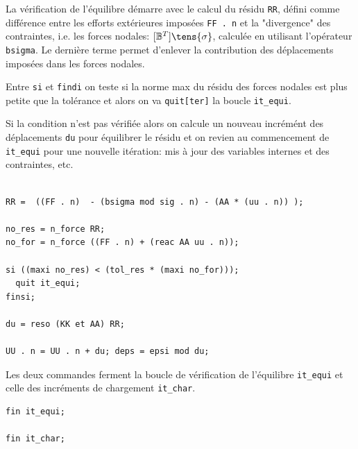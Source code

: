 \begin{castemcom}
La vérification de l'équilibre démarre avec le calcul du 
résidu \texttt{RR}, défini comme différence entre les efforts 
extérieures imposées \texttt{FF . n} 
et la "divergence" des contraintes, i.e. les forces nodales:  
$[\mathbb{B}^T] \tens{\sigma}$, calculée en utilisant 
l'opérateur \texttt{bsigma}. Le dernière terme permet d'enlever 
la contribution des déplacements imposées dans les forces 
nodales.   

Entre \texttt{si} et \texttt{findi} on teste si la norme 
{\rm max} du résidu des forces nodales est plus petite 
que la tolérance  et alors on va \texttt{quit[ter]}
la boucle \texttt{it\_equi}. 

Si la condition n'est pas vérifiée alors on calcule un 
nouveau incrémént des déplacements \texttt{du} 
pour équilibrer le résidu et on revien au commencement de 
\texttt{it\_equi} pour une nouvelle itération:  mis à jour des 
variables internes et des contraintes, etc. 
\end{castemcom}
\begin{castemlines}
\begin{verbatim}

RR =  ((FF . n)  - (bsigma mod sig . n) - (AA * (uu . n)) ); 

no_res = n_force RR;
no_for = n_force ((FF . n) + (reac AA uu . n));

si ((maxi no_res) < (tol_res * (maxi no_for))); 
  quit it_equi;
finsi;

du = reso (KK et AA) RR;

UU . n = UU . n + du; deps = epsi mod du;

\end{verbatim}
\end{castemlines}


\begin{castemcom}
Les deux commandes ferment la boucle de vérification de 
l'équilibre \texttt{it\_equi} et celle des incréments 
de chargement \texttt{it\_char}.  
\end{castemcom}
\begin{castemlines}
\begin{verbatim}
fin it_equi;

fin it_char;
\end{verbatim}
\end{castemlines}

